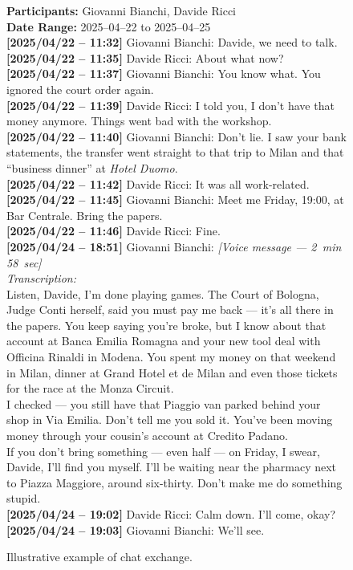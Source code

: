 \begin{figure}[htbp]
\centering
\begin{minipage}{0.92\linewidth}
\small
\textbf{Participants:} Giovanni Bianchi, Davide Ricci\\
\textbf{Date Range:} 2025--04--22 to 2025--04--25\\[0.3em]

\textbf{[2025/04/22 -- 11:32]} Giovanni Bianchi: Davide, we need to talk.\\
\textbf{[2025/04/22 -- 11:35]} Davide Ricci: About what now?\\
\textbf{[2025/04/22 -- 11:37]} Giovanni Bianchi: You know what. You ignored the court order again.\\
\textbf{[2025/04/22 -- 11:39]} Davide Ricci: I told you, I don't have that money anymore. Things went bad with the workshop.\\
\textbf{[2025/04/22 -- 11:40]} Giovanni Bianchi: Don't lie. I saw your bank statements, the transfer went straight to that trip to Milan and that ``business dinner'' at \textit{Hotel Duomo}.\\
\textbf{[2025/04/22 -- 11:42]} Davide Ricci: It was all work-related.\\
\textbf{[2025/04/22 -- 11:45]} Giovanni Bianchi: Meet me Friday, 19:00, at Bar Centrale. Bring the papers.\\
\textbf{[2025/04/22 -- 11:46]} Davide Ricci: Fine.\\[0.3em]

\textbf{[2025/04/24 -- 18:51]} Giovanni Bianchi: \textit{[Voice message --- 2~min 58~sec]}\\
\quad \textit{Transcription:}\\
\quad Listen, Davide, I'm done playing games. The Court of Bologna, Judge Conti herself, said you must pay me back --- it's all there in the papers. You keep saying you're broke, but I know about that account at Banca Emilia Romagna and your new tool deal with Officina Rinaldi in Modena. You spent my money on that weekend in Milan, dinner at Grand Hotel et de Milan and even those tickets for the race at the Monza Circuit.\\
\quad I checked --- you still have that Piaggio van parked behind your shop in Via Emilia. Don't tell me you sold it. You've been moving money through your cousin's account at Credito Padano.\\
\quad If you don't bring something --- even half --- on Friday, I swear, Davide, I'll find you myself. I'll be waiting near the pharmacy next to Piazza Maggiore, around six-thirty. Don't make me do something stupid.\\[0.3em]

\textbf{[2025/04/24 -- 19:02]} Davide Ricci: Calm down. I'll come, okay?\\
\textbf{[2025/04/24 -- 19:03]} Giovanni Bianchi: We'll see.\\
\end{minipage}
\caption{Illustrative example of chat exchange.}
\label{fig:chat-investigation-example}
\end{figure}



